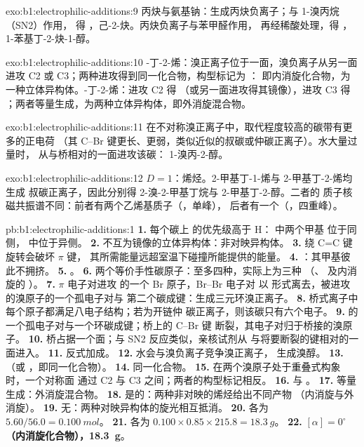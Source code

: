 \begin{solution}{exo:b1:electrophilic-additions:9}
丙炔与氨基钠：生成丙炔负离子；与 1-溴丙烷（SN2）作用，
得 ，己-2-炔。丙炔负离子与苯甲醛作用，
再经稀酸处理，得 ，1-苯基丁-2-炔-1-醇。
\end{solution}

\begin{solution}{exo:b1:electrophilic-additions:10}
-丁-2-烯：溴正离子位于一面，溴负离子从另一面进攻 C2
或 C3；两种进攻得到同一化合物，构型标记为 ：
即内消旋化合物，为一种立体异构体。-丁-2-烯：进攻 C2 得
（或另一面进攻得其镜像），进攻 C3 得
；两者等量生成，为两种立体异构体，即外消旋混合物。
\end{solution}

\begin{solution}{exo:b1:electrophilic-additions:11}
在不对称溴正离子中，取代程度较高的碳带有更多的正电荷
（其 C--Br 键更长、更弱，类似近似的叔碳或仲碳正离子）。水大量过量时，
从与桥相对的一面进攻该碳：
1-溴丙-2-醇。
\end{solution}

\begin{solution}{exo:b1:electrophilic-additions:12}
$D = 1$：烯烃。2-甲基丁-1-烯与 2-甲基丁-2-烯均生成
叔碳正离子，因此分别得 2-溴-2-甲基丁烷与 2-甲基丁-2-醇。二者的
质子核磁共振谱不同：前者有两个乙烯基质子（，单峰），
后者有一个（，四重峰）。
\end{solution}

\begin{solution}{pb:b1:electrophilic-additions:1}
\textbf{1.} 每个碳上  的优先级高于 H： 中两个甲基
位于同侧， 中位于异侧。
\textbf{2.} 不互为镜像的立体异构体：非对映异构体。
\textbf{3.} 绕 C=C 键旋转会破坏 $\pi$ 键，
其所需能量远超室温下碰撞所能提供的能量。
\textbf{4.} ：其甲基彼此不拥挤。
\textbf{5.} 。
\textbf{6.} 两个等价手性碳原子：至多四种，实际上为三种
（、 及内消旋的 ）。
\textbf{7.} $\pi$ 电子对进攻  的一个 Br 原子，Br--Br 电子对
以  形式离去，被进攻的溴原子的一个孤电子对与
第二个碳成键：生成三元环溴正离子。
\textbf{8.} 桥式离子中每个原子都满足八电子结构；若为开链仲
碳正离子，则该碳只有六个电子。
\textbf{9.}  的一个孤电子对与一个环碳成键；桥上的 C--Br 键
断裂，其电子对归于桥接的溴原子。
\textbf{10.} 桥占据一个面；与 SN2 反应类似，亲核试剂从
与将要断裂的键相对的一面进入。
\textbf{11.} 反式加成。
\textbf{12.} 水会与溴负离子竞争溴正离子，
生成溴醇。
\textbf{13.} （或 ，即同一化合物）。
\textbf{14.} 同一化合物。
\textbf{15.} 在两个溴原子处于重叠式构象时，一个对称面
通过 C2 与 C3 之间；两者的构型标记相反。
\textbf{16.}  与 。
\textbf{17.} 等量生成：外消旋混合物。
\textbf{18.} 是的：两种非对映的烯烃给出不同产物
（内消旋与外消旋）。
\textbf{19.} 无：两种对映异构体的旋光相互抵消。
\textbf{20.} 各为 $5.60/56.0 = \qty{0.100}{mol}$。
\textbf{21.} 各为 $0.100 \times 0.85 \times 215.8 = \qty{18.3}{g}$。
\textbf{22.} \textbf{$[\alpha] = 0^\circ$（内消旋化合物），\qty{18.3}{g}}。
\end{solution}
